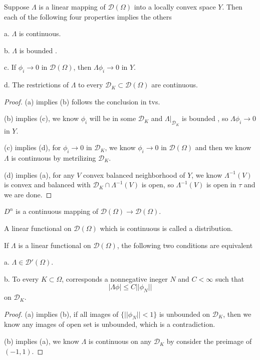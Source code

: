\documentclass[lang=en, color=blue, ]{elegantbook}
\newcommand{\D}{\mathscr{D}}
\begin{document}
\begin{theorem}
    Suppose $\Lambda$ is a linear mapping of $\D(\Omega)$ into a locally convex space $Y$. Then each of the following four properties implies the others\par
    a. $\Lambda$ is continuous.\par
    b. $\Lambda$ is bounded .\par
    c. If $\phi_i \to 0$ in $\D(\Omega)$, then $\Lambda \phi_i \to 0$ in $Y$.\par
    d. The restrictions of $\Lambda$ to every $\D_K\subset \D(\Omega)$ are continuous.
\end{theorem}
\begin{proof}
    (a) implies (b) follows the conclusion in tvs.\par
    (b) implies (c), we know $\phi_i$ will be in some $\D_K$ and $\Lambda|_{\D_K}$ is bounded , so $\Lambda \phi_i\to 0$ in $Y$.\par
    (c) implies (d), for $\phi_i \to 0$ in $\D_K$, we know $\phi_i \to 0$ in $\D(\Omega)$ and then we know $\Lambda$ is continuous by metrilizing $\D_K$.\par
    (d) implies (a), for any $V$ convex balanced neighborhood of $Y$, we know $\Lambda^{-1}(V)$ is convex and balanced with $\D_K \cap \Lambda^{-1}(V)$ is open, so $\Lambda^{-1}(V)$ is open in $\tau$ and we are done.
\end{proof}

\begin{corollary}
    $D^{\alpha}$ is a continuous mapping of $\D(\Omega)\to\D(\Omega)$.
\end{corollary}

\begin{definition}
    A linear functional on $\D(\Omega)$ which is continuous is called a distribution.
\end{definition}

\begin{theorem}
    If $\Lambda$ is a linear functional on $\D(\Omega)$, the following two conditions are equivalent\par
    a. $\Lambda \in \D'(\Omega)$.\par
    b. To every $K\subset \Omega$, corresponds a nonnegative ineger $N$ and $C<\infty$ such that
    \[|\Lambda \phi| \leq C||\phi_N||\]
    on $\D_K$.
\end{theorem}
\begin{proof}
    (a) implies (b), if all images of $\{||\phi_N|| < 1\}$ is unbounded on $\D_K$, then we know any images of open set is unbounded, which is a contradiction.\par
    (b) implies (a), we know $\Lambda$ is continuous on any $\D_K$ by consider the preimage of $(-1,1)$.
\end{proof}
\end{document}

